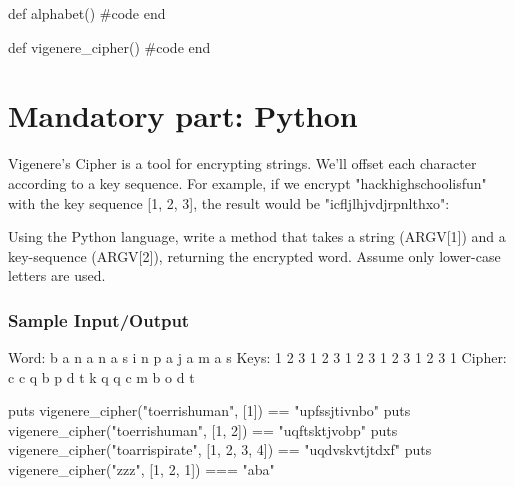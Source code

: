 \documentclass{42-en}
\begin{document}
           \begin{42ccode}
                def alphabet()
                    #code
                end

                def vigenere_cipher()
                    #code
                end
            \end{42ccode}


\chapter{Mandatory part: Python}

    Vigenere's Cipher is a tool for encrypting strings. We'll offset each character
    according to a key sequence. For example, if we encrypt "hackhighschoolisfun" with the
    key sequence [1, 2, 3], the result would be "icfljlhjvdjrpnlthxo":

    Using the Python language, write a method that takes a string (ARGV[1]) and a key-sequence (ARGV[2]), returning the encrypted word. Assume only lower-case letters are used.

    \subsection{Sample Input/Output}

           \begin{42console}
            Word:   b a n a n a s i n p a j a m a s
            Keys:   1 2 3 1 2 3 1 2 3 1 2 3 1 2 3 1
            Cipher: c c q b p d t k q q c m b o d t
            \end{42console}


           \begin{42console}
            puts vigenere_cipher("toerrishuman", [1]) == "upfssjtivnbo"
            puts vigenere_cipher("toerrishuman", [1, 2]) == "uqftsktjvobp"
            puts vigenere_cipher("toarrispirate", [1, 2, 3, 4]) == "uqdvskvtjtdxf"
            puts vigenere_cipher("zzz", [1, 2, 1]) === "aba"
            \end{42console}
\end{document}
